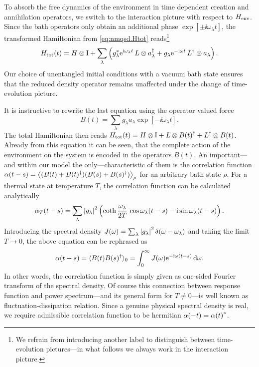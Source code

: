 To absorb the free dynamics of the environment in time dependent creation and annihilation operators, we switch to the interaction picture with respect to $H_\mathrm{env}$.
Since the bath operators only obtain an additional phase $\exp[\pm \ii \omega_\lambda t]$, the transformed Hamiltonian from \autoref{eq:nmqsd.Htot} reads\footnote{%
  We refrain from introducing another label to distinguish between time-evolution pictures---in what follows we always work in the interaction picture.
}
\begin{equation}
  \Htot(t) = \Hsys \otimes \unit  +  \sum_\lambda \left( \cc{g}_\lambda \exp[\ii \omega_\lambda t] \, L \otimes \adj{a}_\lambda + g_\lambda \exp[-\ii \omega t] \, \adj{L} \otimes a_\lambda \right).
  \label{eq:nmqsd.Htot}
\end{equation}
Our choice of unentangled initial conditions with a vacuum bath state ensures that the reduced density operator remains unaffected under the change of time-evolution picture.

It is instructive to rewrite the last equation using the operator valued force
\begin{equation}
  B(t)=\sum_\lambda g_\lambda a_\lambda \exp[-\ii\omega_\lambda t].
  \label{eq:nmqsd.force_operator}
\end{equation}
The total Hamiltonian then reads $H_\mathrm{tot}(t) = H \otimes \mathrm{I}  +  L \otimes B(t)^\dagger  +  L^\dagger \otimes B(t)$.
Already from this equation it can be seen, that the complete action of the environment on the system is encoded in the operators $B(t)$.
An important---and within our model the only---characteristic of them is the correlation function $\alpha(t-s) = \big\langle  (B(t) + B(t)^\dagger)(B(s) + B(s)^\dagger) \big\rangle_\rho$ for an arbitrary bath state $\rho$.
For a thermal state at temperature $T$, the correlation function can be calculated analytically \cite{FeHi10_path_integrals}
\begin{equation}
  \alpha_T(t - s) = \sum_\lambda  \left\vert g_\lambda \right\vert^2  \left( \operatorname{coth} \frac{\omega_\lambda}{2T} \, \cos \omega_\lambda (t-s)  -  \mathrm{i} \sin \omega_\lambda(t-s) \right).
  \label{eq:nmqsd.thermal_correlation_function}
\end{equation}
Introducing the spectral density $J(\omega) = \sum_\lambda \left\vert g_\lambda \right\vert^2 \delta(\omega - \omega_\lambda)$ and taking the limit $T \to 0$, the above equation can be rephrased as
\begin{equation}
  \alpha(t - s) = \qmean{B(t)\adj{B(s)}}_0 = \int_0^\infty J(\omega) \exp[-\ii\omega (t-s)] \dd \omega.
  \label{eq:nmqsd.correlation_function}
\end{equation}
In other words, the correlation function is simply given as one-sided Fourier transform of the spectral density.
Of course this connection between response function and power spectrum---and its general form for $T\neq0$---is well known as fluctuation-dissipation relation.
Since a genuine physical spectral density is real, we require admissible correlation function to be hermitian $\alpha(-t) = {\alpha(t)}^*$.\\

